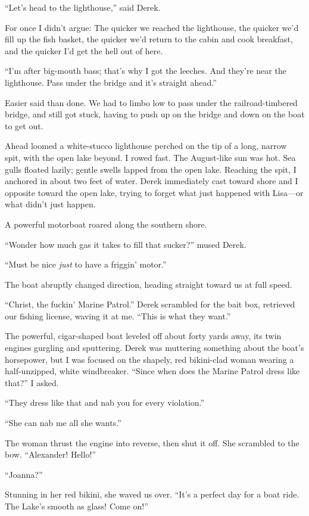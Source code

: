 ``Let's head to the lighthouse,'' said Derek.

For once I didn't argue: The quicker we reached the lighthouse, the
quicker we'd fill up the fish basket, the quicker we'd return to the
cabin and cook breakfast, and the quicker I'd get the hell out of here.

``I'm after big-mouth bass; that's why I got the leeches. And they're
near the lighthouse. Pass under the bridge and it's straight ahead.''

Easier said than done. We had to limbo low to pass under the
railroad-timbered bridge, and still got stuck, having to push up on the
bridge and down on the boat to get out.

Ahead loomed a white-stucco lighthouse perched on the tip of a long,
narrow spit, with the open lake beyond. I rowed fast. The August-like
sun was hot. Sea gulls floated lazily; gentle swells lapped from the
open lake. Reaching the spit, I anchored in about two feet of water.
Derek immediately cast toward shore and I opposite toward the open lake,
trying to forget what just happened with Lisa---or what didn't just
happen.

A powerful motorboat roared along the southern shore.

``Wonder how much gas it takes to fill that sucker?'' mused Derek.

``Must be nice \emph{just} to have a friggin' motor.''

The boat abruptly changed direction, heading straight toward us at full
speed.

``Christ, the fuckin' Marine Patrol.'' Derek scrambled for the bait box,
retrieved our fishing license, waving it at me. ``This is what they
want.''

The powerful, cigar-shaped boat leveled off about forty yards away, its
twin engines gurgling and sputtering. Derek was muttering something
about the boat's horsepower, but I was focused on the shapely, red
bikini-clad woman wearing a half-unzipped, white windbreaker. ``Since
when does the Marine Patrol dress like that?'' I asked.

``They dress like that and nab you for every violation.''

``She can nab me all she wants.''

The woman thrust the engine into reverse, then shut it off. She
scrambled to the bow. ``Alexander! Hello!''

``Joanna?''

Stunning in her red bikini, she waved us over. ``It's a perfect day for
a boat ride. The Lake's smooth as glass! Come on!''

